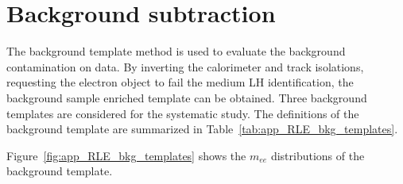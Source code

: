 \section{Background subtraction}
\label{sec:app_RLE_bkg_subtraction}
The background template method is used to evaluate the background contamination on data.
By inverting the calorimeter and track isolations, requesting the electron object to fail the medium LH identification, the background sample enriched template can be obtained.
Three background templates are considered for the systematic study.
The definitions of the background template are summarized in Table~\ref{tab:app_RLE_bkg_templates}.
%
\begin{table}[htbp]
    \caption{The definition of the background templates for estimating the background contamination associated with the $Z$ tag-and-probe method.
    The baseline template is used to estimate the background contamination.
    The variation 1 template has looser requirements and the variation 2 template has tighter requirements.
    They are used to assess the systematic caused by the background contamination.}
    \label{tab:app_RLE_bkg_templates}
\end{table}
%
Figure~\ref{fig:app_RLE_bkg_templates} shows the $m_{ee}$ distributions of the background template.
%
